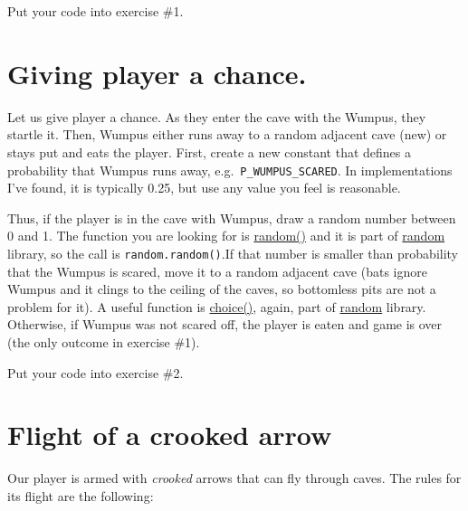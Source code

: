\documentclass[
]{book}
\begin{document}
Put your code into exercise \#1.

\hypertarget{giving-player-a-chance.}{%
\section{Giving player a chance.}\label{giving-player-a-chance.}}

Let us give player a chance. As they enter the cave with the Wumpus, they startle it. Then, Wumpus either runs away to a random adjacent cave (new) or stays put and eats the player. First, create a new constant that defines a probability that Wumpus runs away, e.g.~\texttt{P\_WUMPUS\_SCARED}. In implementations I've found, it is typically 0.25, but use any value you feel is reasonable.

Thus, if the player is in the cave with Wumpus, draw a random number between 0 and 1. The function you are looking for is \href{https://docs.python.org/3/library/random.html\#random.random}{random()} and it is part of \href{https://docs.python.org/3/library/random.html}{random} library, so the call is \texttt{random.random()}.If that number is smaller than probability that the Wumpus is scared, move it to a random adjacent cave (bats ignore Wumpus and it clings to the ceiling of the caves, so bottomless pits are not a problem for it). A useful function is \href{https://docs.python.org/3/library/random.html\#random.choice}{choice()}, again, part of \href{https://docs.python.org/3/library/random.html}{random} library. Otherwise, if Wumpus was not scared off, the player is eaten and game is over (the only outcome in exercise \#1).

Put your code into exercise \#2.

\hypertarget{flight-of-a-crooked-arrow}{%
\section{Flight of a crooked arrow}\label{flight-of-a-crooked-arrow}}

Our player is armed with \emph{crooked} arrows that can fly through caves. The rules for its flight are the following:
\end{document}
